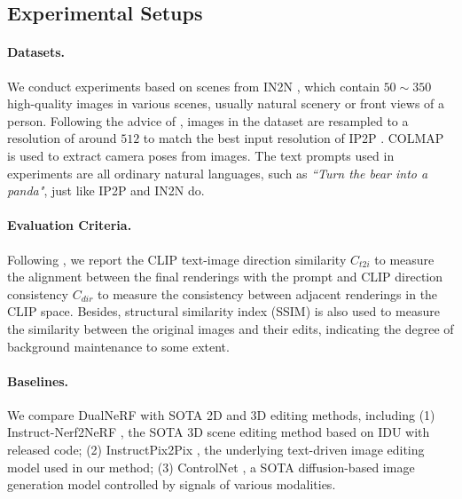 \subsection{Experimental Setups}
\paragraph{Datasets.}
We conduct experiments based on scenes from IN2N \cite{haque2023instruct}, which contain $50 \sim 350$ high-quality images in various scenes, usually natural scenery or front views of a person. Following the advice of \cite{haque2023instruct}, images in the dataset are resampled to a resolution of around $512$ to match the best input resolution of IP2P \cite{brooks2023instructpix2pix}. COLMAP \cite{schoenberger2016sfm} is used to extract camera poses from images. The text prompts used in experiments are all ordinary natural languages, such as \textit{``Turn the bear into a panda"}, just like IP2P and IN2N do. 

\paragraph{Evaluation Criteria.}
\label{sec: Evaluation Criteria}
Following \cite{haque2023instruct}, we report the CLIP text-image direction similarity $C_{t2i}$ to measure the alignment between the final renderings with the prompt and CLIP direction consistency $C_{dir}$ to measure the consistency between adjacent renderings in the CLIP space.
Besides, structural similarity index (SSIM) \cite{wang2004image} is also used to measure the similarity between the original images and their edits, indicating the degree of background maintenance to some extent.

\paragraph{Baselines.}
We compare DualNeRF with SOTA 2D and 3D editing methods, including (1) Instruct-Nerf2NeRF \cite{haque2023instruct}, the SOTA 3D scene editing method based on IDU with released code; (2) InstructPix2Pix \cite{brooks2023instructpix2pix}, the underlying text-driven image editing model used in our method; (3) ControlNet \cite{zhang2023adding}, a SOTA diffusion-based image generation model controlled by signals of various modalities.

